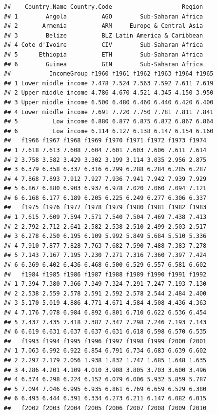 \documentclass[
]{book}
\begin{document}
\begin{verbatim}
##    Country.Name Country.Code                    Region
## 1        Angola          AGO        Sub-Saharan Africa
## 2       Armenia          ARM     Europe & Central Asia
## 3        Belize          BLZ Latin America & Caribbean
## 4 Cote d'Ivoire          CIV        Sub-Saharan Africa
## 5      Ethiopia          ETH        Sub-Saharan Africa
## 6        Guinea          GIN        Sub-Saharan Africa
##           IncomeGroup f1960 f1961 f1962 f1963 f1964 f1965
## 1 Lower middle income 7.478 7.524 7.563 7.592 7.611 7.619
## 2 Upper middle income 4.786 4.670 4.521 4.345 4.150 3.950
## 3 Upper middle income 6.500 6.480 6.460 6.440 6.420 6.400
## 4 Lower middle income 7.691 7.720 7.750 7.781 7.811 7.841
## 5          Low income 6.880 6.877 6.875 6.872 6.867 6.864
## 6          Low income 6.114 6.127 6.138 6.147 6.154 6.160
##   f1966 f1967 f1968 f1969 f1970 f1971 f1972 f1973 f1974
## 1 7.618 7.613 7.608 7.604 7.601 7.603 7.606 7.611 7.614
## 2 3.758 3.582 3.429 3.302 3.199 3.114 3.035 2.956 2.875
## 3 6.379 6.358 6.337 6.316 6.299 6.288 6.284 6.285 6.287
## 4 7.868 7.893 7.912 7.927 7.936 7.941 7.942 7.939 7.929
## 5 6.867 6.880 6.903 6.937 6.978 7.020 7.060 7.094 7.121
## 6 6.168 6.177 6.189 6.205 6.225 6.249 6.277 6.306 6.337
##   f1975 f1976 f1977 f1978 f1979 f1980 f1981 f1982 f1983
## 1 7.615 7.609 7.594 7.571 7.540 7.504 7.469 7.438 7.413
## 2 2.792 2.712 2.641 2.582 2.538 2.510 2.499 2.503 2.517
## 3 6.278 6.250 6.195 6.109 5.992 5.849 5.684 5.510 5.336
## 4 7.910 7.877 7.828 7.763 7.682 7.590 7.488 7.383 7.278
## 5 7.143 7.167 7.195 7.230 7.271 7.316 7.360 7.397 7.424
## 6 6.369 6.402 6.436 6.468 6.500 6.529 6.557 6.581 6.602
##   f1984 f1985 f1986 f1987 f1988 f1989 f1990 f1991 f1992
## 1 7.394 7.380 7.366 7.349 7.324 7.291 7.247 7.193 7.130
## 2 2.538 2.559 2.578 2.591 2.592 2.578 2.544 2.484 2.400
## 3 5.170 5.019 4.886 4.771 4.671 4.584 4.508 4.436 4.363
## 4 7.176 7.078 6.984 6.892 6.801 6.710 6.622 6.536 6.454
## 5 7.437 7.435 7.418 7.387 7.347 7.298 7.246 7.193 7.143
## 6 6.619 6.631 6.637 6.637 6.631 6.618 6.598 6.570 6.535
##   f1993 f1994 f1995 f1996 f1997 f1998 f1999 f2000 f2001
## 1 7.063 6.992 6.922 6.854 6.791 6.734 6.683 6.639 6.602
## 2 2.297 2.179 2.056 1.938 1.832 1.747 1.685 1.648 1.635
## 3 4.286 4.201 4.109 4.010 3.908 3.805 3.703 3.600 3.496
## 4 6.374 6.298 6.224 6.152 6.079 6.006 5.932 5.859 5.787
## 5 7.094 7.046 6.995 6.935 6.861 6.769 6.659 6.529 6.380
## 6 6.493 6.444 6.391 6.334 6.273 6.211 6.147 6.082 6.015
##   f2002 f2003 f2004 f2005 f2006 f2007 f2008 f2009 f2010

\end{verbatim}
\end{document}
